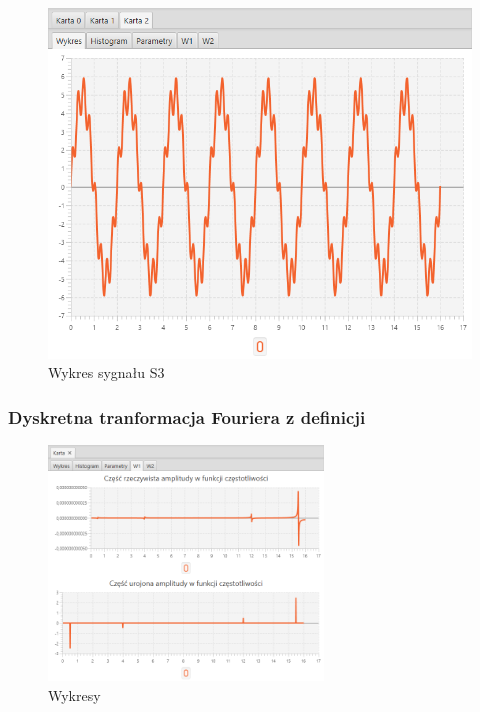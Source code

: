 \documentclass[12pt]{article}
\begin{document}
{{            \begin{figure}[H]
                \centering
                \includegraphics[width=\textwidth]{img/result/s3/data_134923.png}
                \caption{Wykres sygnału S3}
            \end{figure}
            \newpage

            \subsubsection{Dyskretna tranformacja Fouriera z definicji} {

                \begin{figure}[H]
                    \centering
                    \includegraphics[width=0.65\textwidth]{img/result/s3/01/W1_draw_1_sinus_sampling_trans_s3_data_205855.png}
                    \caption{Wykresy}
                \end{figure}

}}}
\end{document}
